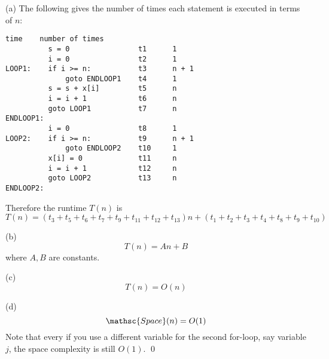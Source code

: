(a) The following gives the number of times each statement is executed
in terms of $n$:
\begin{Verbatim}[frame=single, fontsize=\small]
                               time    number of times 
          s = 0                t1      1
          i = 0                t2      1
LOOP1:    if i >= n:           t3      n + 1
              goto ENDLOOP1    t4      1
          s = s + x[i]         t5      n
          i = i + 1            t6      n
          goto LOOP1           t7      n
ENDLOOP1:
          i = 0                t8      1
LOOP2:    if i >= n:           t9      n + 1
              goto ENDLOOP2    t10     1
          x[i] = 0             t11     n
          i = i + 1            t12     n
          goto LOOP2           t13     n
ENDLOOP2:
\end{Verbatim}
Therefore the runtime $T(n)$ is
\[
T(n) = (t_3 + t_5 + t_6 + t_7 + t_9 + t_{11} + t_{12} + t_{13})n + (t_1 + t_2 + t_3 + t_4 + t_8 + t_9 + t_{10})
\]

(b)
\[
T(n) = An + B
\]
where $A, B$ are constants.

(c)
\[
T(n) = O(n)
\]

(d)
\[
\mathsc{Space}(n) = O(1)
\]
Note that every if you use a different variable for the second for-loop,
say variable $j$, the space complexity is still $O(1)$.
\qed
